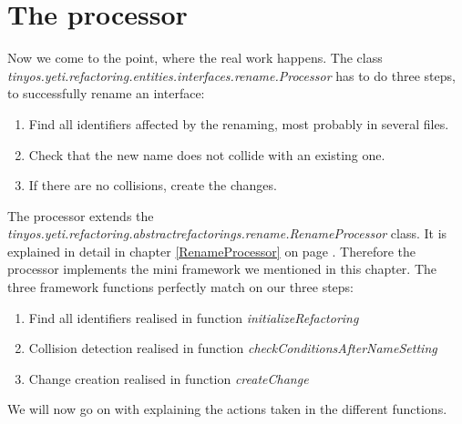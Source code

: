 \documentclass[a4paper,10pt]{report}
\begin{document}
\section{The processor}
Now we come to the point, where the real work happens. The class {\it tinyos.yeti.refactoring.entities.interfaces.rename.Processor} has to do three steps, to successfully rename an interface:
   \begin{enumerate}
    \item Find all identifiers affected by the renaming, most probably in several files.
    \item Check that the new name does not collide with an existing one.
    \item If there are no collisions, create the changes.
   \end{enumerate}
The processor extends the {\it tinyos.yeti.refactoring.abstractrefactorings.rename.RenameProcessor} class. It is explained in detail in chapter \ref{RenameProcessor} on page \pageref{RenameProcessor}.
Therefore the processor implements the mini framework we mentioned in this chapter. The three framework functions perfectly match on our three steps:
   \begin{enumerate}
     \item Find all identifiers realised in function {\it initializeRefactoring}
     \item Collision detection realised in function {\it checkConditionsAfterNameSetting}
     \item Change creation realised in function {\it createChange}
   \end{enumerate}
We will now go on with explaining the actions taken in the different functions.
\end{document}
